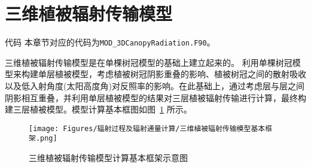 \section{三维植被辐射传输模型}\label{三维植被辐射传输模型}
\begin{mymdframed}{代码}
  本章节对应的代码为\texttt{MOD\_3DCanopyRadiation.F90}。
\end{mymdframed}

三维植被辐射传输模型\citep{yuan20143d}是在单棵树冠模型\citep{dickinson2008determination,dickinson2008three}的基础上建立起来的。
利用单棵树冠模型来构建单层植被模型，考虑植被树冠阴影重叠的影响、植被树冠之间的散射吸收以及低入射角度(太阳高度角)对反照率的影响。在此基础上，通过考虑层与层之间阴影相互重叠，并利用单层植被模型的结果对三层植被辐射传输进行计算，最终构建三层植被模型。模型计算基本框图如图~\ref{fig:三维植被辐射传输模型的基本框架} 所示。
{
  \begin{figure}[htbp]
    \centering
    \texttt{[image: Figures/辐射过程及辐射通量计算/三维植被辐射传输模型基本框架.png]}
    \caption{三维植被辐射传输模型计算基本框架示意图}
    \label{fig:三维植被辐射传输模型的基本框架}
  \end{figure}
}


